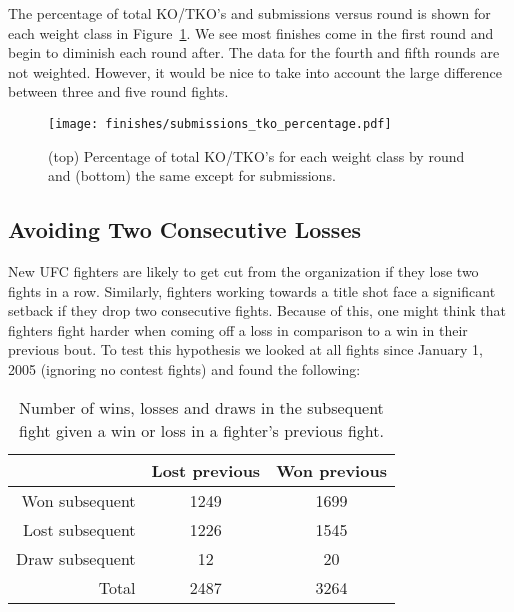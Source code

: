 The percentage of total KO/TKO's and submissions versus
round is shown for each weight class in
Figure~\ref{submissions_tko_percentage}. We see most
finishes come in the first round and begin to diminish
each round after. The data for the fourth and fifth
rounds are not weighted. However, it would be nice to take into account
the large difference between three and five round fights.

\begin{figure}[h]
\begin{center}
\texttt{[image: finishes/submissions\_tko\_percentage.pdf]}
\caption{(top) Percentage of total KO/TKO's for each
weight class by round and (bottom) the same except for submissions.}
\label{submissions_tko_percentage}
\end{center}
\end{figure}


\clearpage
\subsection*{Avoiding Two Consecutive Losses}

New UFC fighters are likely to get cut from the organization if they lose two
fights in a row. Similarly, fighters working towards a title shot
face a significant setback if they drop two consecutive fights. Because of this,
one might think that fighters fight harder when coming off a loss in
comparison to a win in their previous bout.
To test this hypothesis we looked at all fights since January 1, 2005 (ignoring no contest fights) and found
the following:

\begin{center}
\begin{table}[h]
\begin{tabular}{r|cc}
  \toprule
  & Lost previous & Won previous \\
  \hline
  Won subsequent & 1249 & 1699 \\
  Lost subsequent & 1226 & 1545 \\
  Draw subsequent & 12 & 20 \\
  \hline
  Total & 2487 & 3264 \\
  \bottomrule
\end{tabular}
\caption{Number of wins, losses and draws in the subsequent fight given a win or loss in a fighter's previous fight.}
\label{table_avoiding_two_losses}
\end{table}
\end{center}

